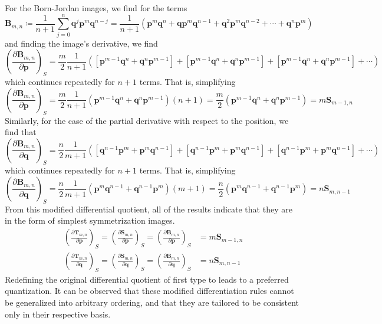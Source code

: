 \documentclass[a4paper]{article}
\theoremstyle{definition}
\begin{document}
For the Born-Jordan images, we find for the terms
\begin{equation}
	\textbf{B}_{m,n}\coloneqq\frac{1}{n+1}\sum_{j=0}^n\textbf{q}^j\textbf{p}^m\textbf{q}^{n-j}=\frac{1}{n+1}\left(\textbf{p}^m\textbf{q}^n+\textbf{q}\textbf{p}^m\textbf{q}^{n-1}+\textbf{q}^2\textbf{p}^m\textbf{q}^{n-2}+\cdots+\textbf{q}^n\textbf{p}^m\right)
\end{equation}
and finding the image's derivative, we find
\begin{equation}
	\left( \frac{\partial\textbf{B}_{m,n}}{\partial\textbf{p}}\right)_S=\frac{m}{2}\frac{1}{n+1}\left([\textbf{p}^{m-1}\textbf{q}^n+\textbf{q}^n\textbf{p}^{m-1}]+[\textbf{p}^{m-1}\textbf{q}^n+\textbf{q}^n\textbf{p}^{m-1}]+[\textbf{p}^{m-1}\textbf{q}^n+\textbf{q}^n\textbf{p}^{m-1}]+\cdots\right) 
\end{equation}
which continues repeatedly for $n+1$ terms. That is, simplifying
\begin{equation}
	\left( \frac{\partial\textbf{B}_{m,n}}{\partial\textbf{p}}\right)_S=\frac{m}{2}\frac{1}{n+1}\left(\textbf{p}^{m-1}\textbf{q}^n+\textbf{q}^n\textbf{p}^{m-1}\right)(n+1)=\frac{m}{2}\left(\textbf{p}^{m-1}\textbf{q}^n+\textbf{q}^n\textbf{p}^{m-1}\right)=m\textbf{S}_{m-1,n}
\end{equation}
Similarly, for the case of the partial derivative with respect to the position, we find that
\begin{equation}
	\left( \frac{\partial\textbf{B}_{m,n}}{\partial\textbf{q}}\right)_S=\frac{n}{2}\frac{1}{m+1}\left([\textbf{q}^{n-1}\textbf{p}^m+\textbf{p}^m\textbf{q}^{n-1}]+[\textbf{q}^{n-1}\textbf{p}^m+\textbf{p}^m\textbf{q}^{n-1}]+[\textbf{q}^{n-1}\textbf{p}^m+\textbf{p}^m\textbf{q}^{n-1}]+\cdots\right) 
\end{equation}
which continues repeatedly for $n+1$ terms. That is, simplifying
\begin{equation}
	\left( \frac{\partial\textbf{B}_{m,n}}{\partial\textbf{q}}\right)_S=\frac{n}{2}\frac{1}{m+1}\left(\textbf{p}^{m}\textbf{q}^{n-1}+\textbf{q}^{n-1}\textbf{p}^{m}\right)(m+1)=\frac{n}{2}\left(\textbf{p}^{m}\textbf{q}^{n-1}+\textbf{q}^{n-1}\textbf{p}^{m}\right)=n\textbf{S}_{m,n-1}
\end{equation}
From this modified differential quotient, all of the results indicate that they are in the form of simplest symmetrization images.
\begin{eqnarray}
	\left( \frac{\partial\textbf{T}_{m,n}}{\partial\textbf{p}}\right)_S=\left( \frac{\partial\textbf{S}_{m,n}}{\partial\textbf{p}}\right)_S=\left( \frac{\partial\textbf{B}_{m,n}}{\partial\textbf{p}}\right)_S&=m\textbf{S}_{m-1,n}\\
	\left( \frac{\partial\textbf{T}_{m,n}}{\partial\textbf{q}}\right)_S=\left( \frac{\partial\textbf{S}_{m,n}}{\partial\textbf{q}}\right)_S=\left( \frac{\partial\textbf{B}_{m,n}}{\partial\textbf{q}}\right)_S&=n\textbf{S}_{m,n-1}
\end{eqnarray}
Redefining the original differential quotient of first type to leads to a preferred quantization. It can be observed that these modified differentiation rules cannot be generalized into arbitrary ordering, and that they are tailored to be consistent only in their respective basis.
\end{document}
